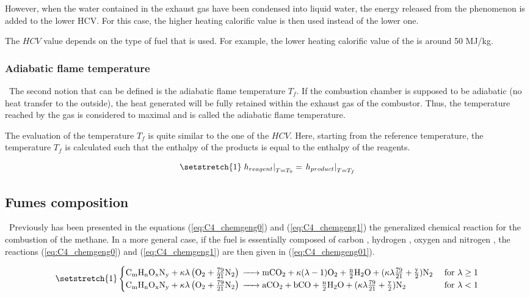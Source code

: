 However, when the water contained in the exhaust gas have been condensed into liquid water, the energy released from the phenomenon is added to the lower HCV. For this case, the higher heating calorific value is then used instead of the lower one.  

The \(HCV\) value depends on the type of fuel that is used. For example, the lower heating calorific value of the  is around 50 MJ/kg.

\subsubsection{Adiabatic flame temperature}
\quad\ The second notion that can be defined is the adiabatic flame temperature \(T_f\). If the combustion chamber is supposed to be adiabatic (no heat transfer to the outside), the heat generated will be fully retained within the exhaust gas of the combustor. Thus, the temperature reached by the gas is considered to maximal and is called the adiabatic flame temperature.

The evaluation of the temperature \(T_f\) is quite similar to the one of the \(HCV\). Here, starting from the reference temperature, the temperature \(T_f\) is calculated such that the enthalpy of the products is equal to the enthalpy of the reagents.

\begin{equation}
    \setstretch{1}
    \left.h_{reagent}\right|_{T=T_0} = \left.h_{product}\right|_{T=T_f}\label{eq:C4_T_f}
\end{equation}

\subsection{Fumes composition}
\quad\ Previously has been presented in the equations (\ref{eq:C4_chemgeng0}) and (\ref{eq:C4_chemgeng1}) the generalized chemical reaction for the combustion of the methane.
In a more general case, if the fuel is essentially composed of carbon , hydrogen , oxygen  and nitrogen , the reactions (\ref{eq:C4_chemgeng0}) and (\ref{eq:C4_chemgeng1}) are then given in (\ref{eq:C4_chemgeng01}).

\begin{equation}
    \setstretch{1}
    \begin{cases}
        \ce{C_{\text{m}}H_{\text{n}}O_{\text{x}}N_{\text{y}} +}\kappa\lambda \left(\ce{O2}+\frac{79}{21}\ce{N2}\right) \ce{-> mCO2 +} \kappa(\lambda-1)\ce{O2 + \frac{n}{2}H2O +} (\kappa\lambda\frac{79}{21} + \frac{\text{y}}{2})\ce{N2} & \text{ for \(\lambda\geq 1\)} \\
        \ce{C_{\text{m}}H_{\text{n}}O_{\text{x}}N_{\text{y}} +}\kappa\lambda \left(\ce{O2}+\frac{79}{21}\ce{N2}\right) \ce{-> aCO2 + bCO + \frac{n}{2}H2O} + (\kappa\lambda\frac{79}{21} + \frac{\text{y}}{2})\ce{N2}                      & \text{ for \(\lambda< 1\)}
    \end{cases}\label{eq:C4_chemgeng01}
\end{equation}

